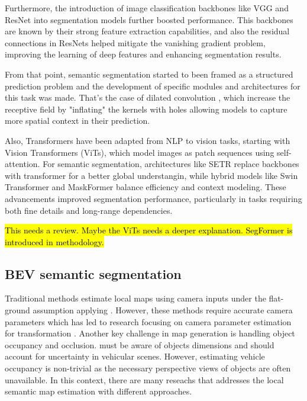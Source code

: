 Furthermore, the introduction of image classification backbones like VGG \cite{VGG} and ResNet \cite{ResNet} into segmentation models further boosted performance. This backbones are known by their strong feature extraction capabilities, and also the residual connections in ResNets helped mitigate the vanishing gradient problem, improving the learning of deep features and enhancing segmentation results.

From that point, semantic segmentation started to been framed as a structured prediction problem and the development of specific modules and architectures for this task was made. That's the case of dilated convolution \cite{ditaled_conv}, which increase the receptive field by "inflating" the  kernels with holes allowing models to capture more spatial context in their prediction.

Also, Transformers have been adapted from NLP to vision tasks, starting with Vision Transformers (ViTs), which model images as patch sequences using self-attention. For semantic segmentation, architectures like SETR replace  backbones with transformer for a better global understangin, while hybrid models like Swin Transformer and MaskFormer balance efficiency and context modeling. These advancements improved segmentation performance, particularly in tasks requiring both fine details and long-range dependencies.

\hl{This needs a review. Maybe the ViTs needs a deeper explanation. SegFormer is introduced in methodology.}


\subsection{BEV semantic segmentation} \label{sota_BEV_semantic_segmentation}
Traditional methods \cite{3d_traffic_scene_understanding} estimate local  maps using camera inputs under the flat-ground assumption applying . However, these methods require accurate camera parameters which has led to research focusing on camera parameter estimation for  transformation \cite{BEV_params_estimation1} \cite{BEV_params_estimation2}. Another key challenge in  map generation is handling object occupancy and occlusion.  must be aware of objects dimensions and should account for uncertainty in vehicular scenes. However, estimating vehicle occupancy is non-trivial as the necessary perspective views of objects are often unavailable. In this context, there are many reseachs that addresses the local semantic map estimation with different approaches.

